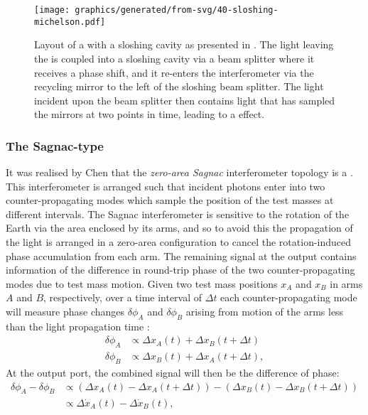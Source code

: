\begin{figure}
  \centering
  \texttt{[image: graphics/generated/from-svg/40-sloshing-michelson.pdf]}
  \caption[Layout of a \FPMI{} with a sloshing cavity]{\label{fig:sloshing-michelson}Layout of a \FPMI{} with a sloshing cavity as presented in \cite{Purdue2002}. The light leaving the \FPMI{} is coupled into a sloshing cavity via a beam splitter where it receives a phase shift, and it re-enters the interferometer via the recycling mirror to the left of the sloshing beam splitter. The light incident upon the beam splitter then contains light that has sampled the mirrors at two points in time, leading to a \SM{} effect.}
\end{figure}

\subsubsection{The Sagnac-type \SM{}}
It was realised by Chen that the \emph{zero-area Sagnac} interferometer topology is a \SM{} \cite{Chen2003}. This interferometer is arranged such that incident photons enter into two counter-propagating modes which sample the position of the test masses at different intervals. The Sagnac interferometer is sensitive to the rotation of the Earth via the area enclosed by its arms, and so to avoid this the propagation of the light is arranged in a zero-area configuration to cancel the rotation-induced phase accumulation from each arm. The remaining signal at the output contains information of the difference in round-trip phase of the two counter-propagating modes due to test mass motion. Given two test mass positions $x_{A}$ and $x_{B}$ in arms $A$ and $B$, respectively, over a time interval of $\Delta t$ each counter-propagating mode will measure phase changes $\delta \phi_{A}$ and $\delta \phi_{B}$ arising from motion of the arms less than the light propagation time \cite{Chen2003}:
\begin{align}
  \delta \phi_{A} &\propto \Delta x_{A} \left( t \right) + \Delta x_{B} \left( t + \Delta t \right) \\
  \delta \phi_{B} &\propto \Delta x_{B} \left( t \right) + \Delta x_{A} \left( t + \Delta t \right),
\end{align}
At the output port, the combined signal will then be the difference of phase:
\begin{equation}
  \begin{split}
    \delta \phi_{A} - \delta \phi_{B} &\propto \left( \Delta x_{A} \left( t \right) - \Delta x_{A} \left( t + \Delta t \right) \right) - \left( \Delta x_{B} \left( t \right) - \Delta x_{B} \left( t + \Delta t \right) \right) \\
                                      &\propto \Delta \dot{x}_{A} \left( t \right) - \Delta \dot{x}_{B} \left( t \right),
  \end{split}
\end{equation}
